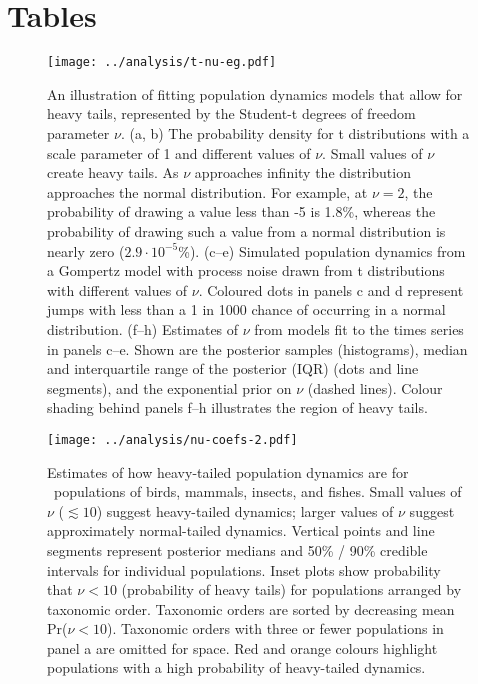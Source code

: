 


\clearpage

\section{Tables}



\begin{figure}[htbp]
\begin{center}
\texttt{[image: ../analysis/t-nu-eg.pdf]}
\caption{
An illustration of fitting population dynamics models that allow for heavy
tails, represented by the Student-t degrees of freedom parameter $\nu$. (a, b)
The probability density for t distributions with a scale parameter of 1 and
different values of $\nu$. Small values of $\nu$ create heavy tails. As $\nu$
approaches infinity the distribution approaches the normal distribution. For
example, at $\nu = 2$, the probability of drawing a value less than -5 is
1.8\%, whereas the probability of drawing such a value from a normal
distribution is nearly zero ($2.9\cdot10^{-5}$\%). (c--e) Simulated population
dynamics from a Gompertz model with process noise drawn from t distributions
with different values of $\nu$. Coloured dots in panels c and d represent jumps
with less than a 1 in 1000 chance of occurring in a normal distribution. (f--h)
Estimates of $\nu$ from models fit to the times series in panels c--e. Shown
are the posterior samples (histograms), median and interquartile range of the
posterior (IQR) (dots and line segments), and the exponential prior on $\nu$
(dashed lines). Colour shading behind panels f--h illustrates the region of
heavy tails.}
\label{fig:didactic}
\end{center}
\end{figure}

\clearpage

\begin{figure}[htbp]
\begin{center}
\texttt{[image: ../analysis/nu-coefs-2.pdf]}
\caption{
Estimates of how heavy-tailed population dynamics are for \nuCoefPopN\
populations of birds, mammals, insects, and fishes. Small values of $\nu$
($\lesssim 10$) suggest heavy-tailed dynamics; larger values of $\nu$ suggest
approximately normal-tailed dynamics. Vertical points and line segments
represent posterior medians and 50\% / 90\% credible intervals for individual
populations. Inset plots show probability that $\nu < 10$ (probability of heavy
tails) for populations arranged by taxonomic order. Taxonomic orders are sorted
by decreasing mean Pr($\nu < 10$). Taxonomic orders with three or fewer
populations in panel a are omitted for space. Red and orange colours highlight
populations with a high probability of heavy-tailed dynamics.
}
\label{fig:nu-coefs}
\end{center}
\end{figure}

